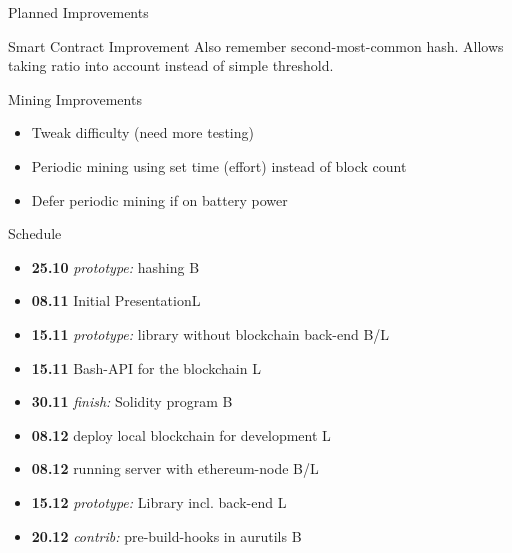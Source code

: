 \documentclass{beamer}
\begin{document}
\begin{frame}{Planned Improvements}
	\begin{block}{Smart Contract Improvement}
		Also remember second-most-common hash.
		Allows taking ratio into account instead of simple threshold.
	\end{block}

	\pause
	\begin{block}{Mining Improvements}
		\begin{itemize}
			\item Tweak difficulty (need more testing) %
			\item Periodic mining using set time (effort) instead of block count %
			\item Defer periodic mining if on battery power
		\end{itemize}
	\end{block}
\end{frame}


\begin{frame}{Schedule}
	\begin{itemize}
		\item \textbf{25.10} \emph{prototype:} hashing \hfill B
		\item \textbf{08.11} \alert{Initial Presentation}\hfill L
		\item \textbf{15.11} \emph{prototype:} library without blockchain back-end \hfill B/L
		\item \textbf{15.11} Bash-API for the blockchain \hfill L
		\item \textbf{30.11} \emph{finish:} \alert{Solidity program} \hfill B
		\item \textbf{08.12} deploy local blockchain for development \hfill L
		\item \textbf{08.12} running server with ethereum-node \hfill B/L
		\item \textbf{15.12} \emph{prototype:} \alert{Library} incl. back-end \hfill L
		\item \textbf{20.12} \emph{contrib:} pre-build-hooks in aurutils \hfill B
	\end{itemize}
\end{frame}
\end{document}
